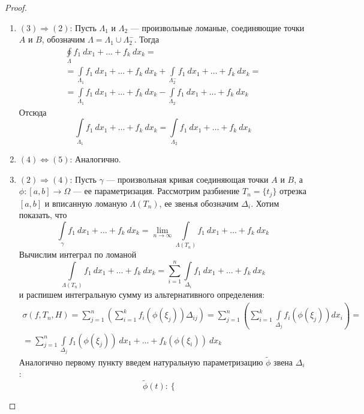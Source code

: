 \begin{proof}
\begin{enumerate}
\begin{multline*}
            =\int\limits_{\Lambda_1}f_1\ dx_1+\dots+f_k\ dx_k-\int\limits_{\Lambda_2}f_1\ dx_1+\dots+f_k\ dx_k
        \end{multline*}
        Поскольку $\Lambda_1$ и $\Lambda_2$ соединяют точки $A$ и $B$, то интегралы от них совпадают, значит, искомый интеграл по замкнутому контуру равен нулю.
        \item $(3)\Rightarrow(2)$: Пусть $\Lambda_1$ и $\Lambda_2$ --- произвольные ломаные, соединяющие точки $A$ и $B$, обозначим $\Lambda=\Lambda_1\cup\Lambda_2^-$. Тогда
        \begin{multline*}
            \oint\limits_{\Lambda}f_1\ dx_1+\dots+f_k\ dx_k=\\
            =\int\limits_{\Lambda_1}f_1\ dx_1+\dots+f_k\ dx_k+\int\limits_{\Lambda_2^-}f_1\ dx_1+\dots+f_k\ dx_k=\\
            =\int\limits_{\Lambda_1}f_1\ dx_1+\dots+f_k\ dx_k-\int\limits_{\Lambda_2}f_1\ dx_1+\dots+f_k\ dx_k
        \end{multline*}
        Отсюда
        \[\int\limits_{\Lambda_1}f_1\ dx_1+\dots+f_k\ dx_k=\int\limits_{\Lambda_2}f_1\ dx_1+\dots+f_k\ dx_k\]
        \item $(4)\Leftrightarrow(5)$: Аналогично.
        \item $(2)\Rightarrow(4)$: Пусть $\gamma$ --- произвольная кривая соединяющая точки $A$ и $B$, а $\phi:[a,b]\to \Omega$ --- ее параметризация. Рассмотрим разбиение $T_n=\{t_j\}$ отрезка $[a,b]$ и вписанную ломаную $\Lambda(T_n)$, ее звенья обозначим $\Delta_i$. Хотим показать, что
        \[\int\limits_{\gamma}f_1\ dx_1+\dots+f_k\ dx_k=\lim\limits_{n\to\infty}\int\limits_{\Lambda(T_n)}f_1\ dx_1+\dots+f_k\ dx_k\]
        Вычислим интеграл по ломаной
        \[\int\limits_{\Lambda(T_n)}f_1\ dx_1+\dots+f_k\ dx_k=\sum\limits_{i=1}^{n}\int\limits_{\Delta_i}f_1\ dx_1+\dots+f_k\ dx_k\]
        и распишем интегральную сумму из альтернативного определения:
        \begin{multline*}
            \sigma(f,T_n,H)=\sum\limits_{j=1}^{n}\left(\sum\limits_{i=1}^{k}f_i(\phi(\xi_j))\Delta_{ij}\right)=\sum\limits_{j=1}^{n}\left(\sum\limits_{i=1}^{k}\int\limits_{\Delta_j}f_i(\phi(\xi_j))dx_i\right)=\\
            =\sum\limits_{j=1}^{n}\int\limits_{\Delta_j}f_1(\phi(\xi_j))\ dx_1+\dots+f_k(\phi(\xi_i))\ dx_k
        \end{multline*}
        Аналогично первому пункту введем натуральную параметризацию $\widetilde{\phi}$ звена $\Delta_i$:
        \[\widetilde{\phi}(t): \begin{cases}

\end{cases}\]
\end{enumerate}
\end{proof}
